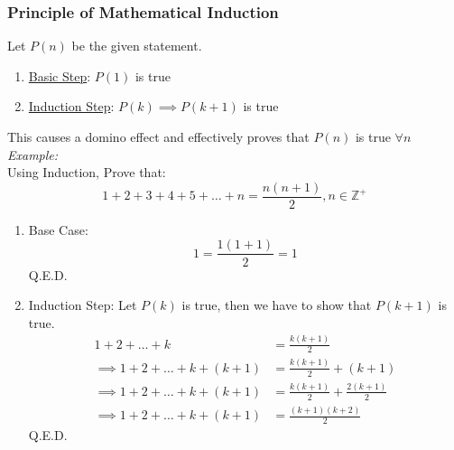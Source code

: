 \documentclass[11pt,letterpaper]{article}
\newenvironment{example}                             
        {\noindent\textit{Example:}\\}
	{}
\begin{document}
\subsubsection{Principle of Mathematical Induction}
Let $P(n)$ be the given statement.
\begin{enumerate}
  \item \underline{Basic Step}: $P(1)$ is true
\item \underline{Induction Step}: $P(k) \implies P(k+1)$ is true
\end{enumerate}
This causes a domino effect and effectively proves that $P(n)$ is true $\forall n$
\begin{example}
  Using Induction, Prove that:
  \[
    1 + 2 + 3 + 4 + 5 + \dots + n = \frac{n(n+1)}{2}, n \in \mathbb{Z}^+
  \]
  \begin{enumerate}
    \item Base Case: \\ 
      \[
        1 = \frac{1(1+1)}{2} = 1
      \]
      \hfill Q.E.D.
    \item Induction Step:
      Let $P(k)$ is true, then we have to show that   $P(k+1)$ is true.
      \begin{align*}
        1+2+ \dots + k &= \frac{k(k+1)}{2} \\
        \implies 1+2+ \dots + k + (k+1) &= \frac{k(k+1)}{2} + (k+1) \\
        \implies 1+2+ \dots + k + (k+1) &= \frac{k(k+1)}{2} + \frac{2(k+1)}{2} \\
        \implies 1+2+ \dots + k + (k+1) &= \frac{(k+1)(k+2)}{2}
      \end{align*}
      \hfill Q.E.D.
  \end{enumerate}
\end{example}
\end{document}
